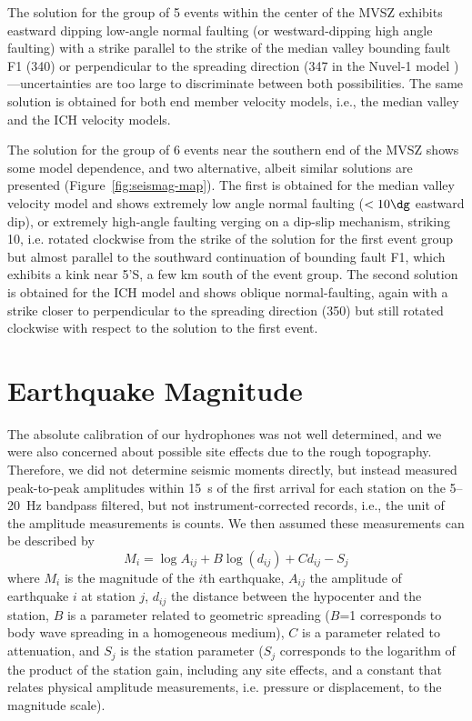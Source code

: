 \documentclass[jgr]{agu2001}
\newlength{\tw}
\begin{document}
\begin{article}
The solution for the group of 5 events within the center of the
MVSZ exhibits eastward dipping low-angle normal
faulting (or westward-dipping high angle faulting)
with a strike parallel to the strike of the median valley bounding
fault F1 (340\dg) or perpendicular to the spreading direction (347{\dg} in
the Nuvel-1 model \citep{demets90})---uncertainties are too large to
discriminate between both possibilities.
The same solution is obtained for both end member velocity models,
i.e., the median valley and the ICH velocity models.

The solution for the group of 6 events near the southern end of
the MVSZ shows some model dependence, and two alternative, albeit similar
solutions are presented (Figure~\ref{fig:seismag-map}).  The first is obtained for the median valley
velocity model and shows extremely low angle normal faulting ($<10\dg$
eastward dip), or extremely high-angle faulting verging on a dip-slip
mechanism, striking 10\dg, i.e. rotated clockwise from the strike of
the solution for the first event group but almost parallel to the southward continuation
of bounding fault F1, which exhibits a kink near 5'S,  a few km south of the
event group.  The second solution is obtained for the ICH model and
shows oblique normal-faulting, again with a strike closer to
perpendicular to the spreading direction (350\dg) but still rotated
clockwise with respect to the  solution to the first event.

\section{Earthquake Magnitude}

The absolute calibration of our hydrophones was not well determined,
and we were also concerned about possible site effects due to
the rough topography.  Therefore, we did not determine seismic moments
directly, but instead measured peak-to-peak amplitudes within 15~s of
the first arrival for each station on the 5--20~Hz bandpass filtered,
but not instrument-corrected
records, i.e., the unit of the amplitude measurements is counts.
  We then assumed these measurements
can be described by \citep[modified from][]{hutton87}
\begin{equation}
M_i=\log A_{ij} + B \log(d_{ij}) + C d_{ij} - S_{j}
\end{equation}
where $M_i$ is the magnitude of the $i$th earthquake, $A_{ij}$ the
amplitude of earthquake $i$ at station $j$, $d_{ij}$ the distance
between the hypocenter and the station, $B$ is a parameter related to
geometric spreading ($B$=1 corresponds to body wave spreading in a
homogeneous medium), $C$ is a parameter related to attenuation, and
$S_{j}$ is the station parameter ($S_{j}$ corresponds to the logarithm
of the product of the station gain, including any site effects, and a
constant that relates physical amplitude measurements, i.e. pressure
or displacement, to the magnitude scale).


\end{article}
\end{document}

